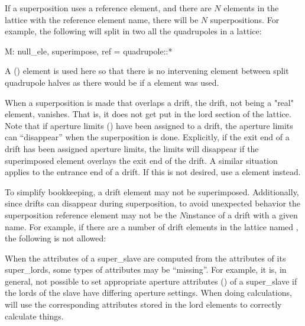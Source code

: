 If a superposition uses a reference element, and there are $N$ elements in the lattice with the
reference element name, there will be $N$ superpositions. For example, the following will split in
two all the quadrupoles in a lattice:
\begin{example}
  M: null_ele, superimpose, ref = quadrupole::*
\end{example}
A  () element is used here so that there is no intervening element
between split quadrupole halves as there would be if a  element was used.


When a superposition is made that overlaps a drift, the drift, not being a "real" element,
vanishes. That is, it does not get put in the lord section of the lattice.  Note that if aperture
limits () have been assigned to a drift, the aperture limits can ``disappear'' when
the superposition is done. Explicitly, if the exit end of a drift has been assigned aperture limits,
the limits will disappear if the superimposed element overlays the exit end of the drift. A similar
situation applies to the entrance end of a drift. If this is not desired, use a  element
instead. 

To simplify bookkeeping, a drift element may not be superimposed. Additionally, since drifts can
disappear during superposition, to avoid unexpected behavior the superposition reference element may
not be the $N$\Th instance of a drift with a given name. For example, if there are a number of drift
elements in the lattice named , the following is not allowed:

When the attributes of a super_slave are computed from the attributes of its super_lords, some types
of attributes may be ``missing''. For example, it is, in general, not possible to set appropriate
aperture attributes () of a super_slave if the lords of the slave have differing
aperture settings. When doing calculations, \bmad will use the corresponding attributes stored in
the lord elements to correctly calculate things.


